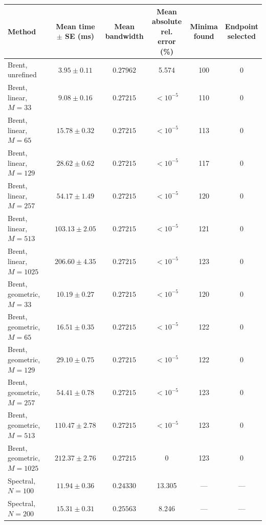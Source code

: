 \begin{table}[htbp]
    \centering
    \footnotesize
    \setlength{\tabcolsep}{3pt}
    \begin{tabular}{lccccc}
        \toprule
        Method & \shortstack{Mean time\\$\pm$ SE (ms)} & \shortstack{Mean\\bandwidth} & \shortstack{Mean absolute\\rel. error (\%)} & \shortstack{Minima\\found} & \shortstack{Endpoint\\selected} \\
        \midrule
        Brent, unrefined & $3.95 \pm 0.11$ & $0.27962$ & 5.574 & 100 & 0 \\
        \midrule
        Brent, linear, $M=33$ & $9.08 \pm 0.16$ & $0.27215$ & $<10^{-5}$ & 110 & 0 \\
        Brent, linear, $M=65$ & $15.78 \pm 0.32$ & $0.27215$ & $<10^{-5}$ & 113 & 0 \\
        Brent, linear, $M=129$ & $28.62 \pm 0.62$ & $0.27215$ & $<10^{-5}$ & 117 & 0 \\
        Brent, linear, $M=257$ & $54.17 \pm 1.49$ & $0.27215$ & $<10^{-5}$ & 120 & 0 \\
        Brent, linear, $M=513$ & $103.13 \pm 2.05$ & $0.27215$ & $<10^{-5}$ & 121 & 0 \\
        Brent, linear, $M=1025$ & $206.60 \pm 4.35$ & $0.27215$ & $<10^{-5}$ & 123 & 0 \\
        \midrule
        Brent, geometric, $M=33$ & $10.19 \pm 0.27$ & $0.27215$ & $<10^{-5}$ & 120 & 0 \\
        Brent, geometric, $M=65$ & $16.51 \pm 0.35$ & $0.27215$ & $<10^{-5}$ & 122 & 0 \\
        Brent, geometric, $M=129$ & $29.10 \pm 0.75$ & $0.27215$ & $<10^{-5}$ & 122 & 0 \\
        Brent, geometric, $M=257$ & $54.41 \pm 0.78$ & $0.27215$ & $<10^{-5}$ & 123 & 0 \\
        Brent, geometric, $M=513$ & $110.47 \pm 2.78$ & $0.27215$ & $<10^{-5}$ & 123 & 0 \\
        Brent, geometric, $M=1025$ & $212.37 \pm 2.76$ & $0.27215$ & 0 & 123 & 0 \\
        \midrule
        Spectral, $N=100$ & $11.94 \pm 0.36$ & $0.24330$ & 13.305 & --- & --- \\
        Spectral, $N=200$ & $15.31 \pm 0.31$ & $0.25563$ & 8.246 & --- & --- \\

\end{tabular}
\end{table}
